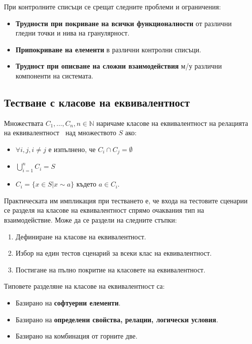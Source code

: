 \documentclass[fleqn,12pt]{article}
\begin{document}
При контролните списъци се срещат следните проблеми и ограничения:
\begin{itemize}
    \item \textbf{Трудности при покриване на всички функционалности} от различни гледни точки и нива на гранулярност.
    \item \textbf{Припокриване на елементи} в различни контролни списъци.
    \item \textbf{Трудност при описване на сложни взаимодействия} м/у различни компоненти на системата.
\end{itemize}

\subsection{Тестване с класове на еквивалентност}

Множествата $C_1, \dots, C_n, n \in \mathbb{N}$ наричаме класове на еквивалентност на релацията на еквивалентност $~$ над множеството $S$ ако:
\begin{itemize}
    \item $\forall i, j, i \neq j$ е изпълнено, че $C_i \cap C_j = \emptyset$
    \item $\bigcup\limits_{i=1}^{n} C_i = S$
    \item $C_i = \{x \in S | x \sim a\}$ където $a \in C_i$.
\end{itemize}

Практическата им импликация при тестването е, че входа на тестовите сценарии се разделя на класове на еквивалентност спрямо очаквания тип на взаимодействие.
Може да се раздели на следните стъпки:
\begin{enumerate}
    \item Дефиниране на класове на еквивалентност.
    \item Избор на един тестов сценарий за всеки клас на еквивалентност.
    \item Постигане на пълно покритие на класовете на еквивалентност.
\end{enumerate}

Типовете разделяне на класове на еквивалентност са:
\begin{itemize}
    \item Базирано на \textbf{софтуерни елементи}.
    \item Базирано на \textbf{определени свойства, релации, логически условия}.
    \item Базирано на комбинация от горните две.
\end{itemize}
\end{document}
